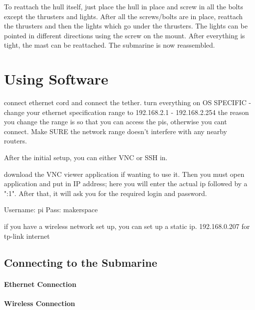 \documentclass[
10pt, %
a4paper, %
oneside, %
headinclude,footinclude, %
BCOR5mm, %
]{scrartcl}
\begin{document}
To reattach the hull itself, just place the hull in place and screw in all the bolts except the thrusters and lights. After all the screws/bolts are in place, reattach the thrusters and then the lights which go under the thrusters. The lights can be pointed in different directions using the screw on the mount. After everything is tight, the mast can be reattached. The submarine is now reassembled.


\section{Using Software}
 connect ethernet cord and connect the tether.
turn everything on
OS SPECIFIC - change your ethernet specification range to 192.168.2.1 - 192.168.2.254
the reason you change the range is so that you can access the pis, otherwise you cant connect. Make SURE the network range doesn't interfere with any nearby routers.

After the initial setup, you can either VNC or SSH in.

download the VNC viewer application if wanting to use it. Then you must open application and put in IP address; here you will enter the actual ip followed by a ":1". After that, it will ask you for the required login and password.

Username: pi
Pass: makerspace

if you have a wireless network set up, you can set up a static ip. 192.168.0.207 for tp-link internet


\subsection{Connecting to the Submarine}

\paragraph{Ethernet Connection}
\paragraph{Wireless Connection}
\end{document}
